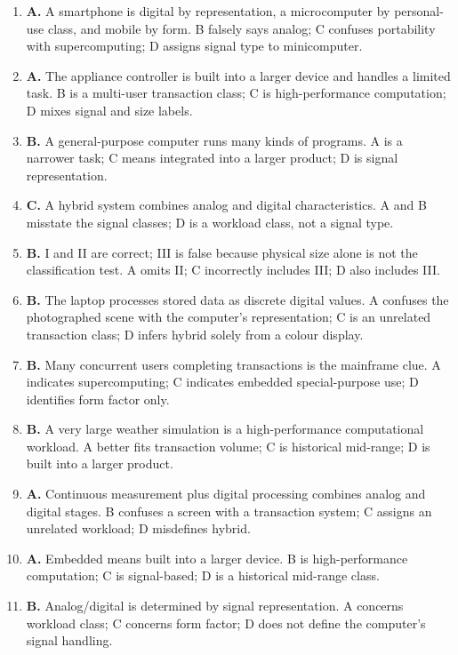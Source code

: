 \documentclass[11pt]{article}
\begin{document}
\begin{enumerate}[label=\textbf{Q\arabic*.}, leftmargin=*]
  classification axes.
\item \textbf{A.} A smartphone is digital by representation, a microcomputer
  by personal-use class, and mobile by form. B falsely says analog; C
  confuses portability with supercomputing; D assigns signal type to
  minicomputer.
\item \textbf{A.} The appliance controller is built into a larger device and
  handles a limited task. B is a multi-user transaction class; C is
  high-performance computation; D mixes signal and size labels.
\item \textbf{B.} A general-purpose computer runs many kinds of programs. A
  is a narrower task; C means integrated into a larger product; D is
  signal representation.
\item \textbf{C.} A hybrid system combines analog and digital characteristics.
  A and B misstate the signal classes; D is a workload class, not a signal
  type.
\item \textbf{B.} I and II are correct; III is false because physical size
  alone is not the classification test. A omits II; C incorrectly includes
  III; D also includes III.
\item \textbf{B.} The laptop processes stored data as discrete digital
  values. A confuses the photographed scene with the computer's
  representation; C is an unrelated transaction class; D infers hybrid
  solely from a colour display.
\item \textbf{B.} Many concurrent users completing transactions is the
  mainframe clue. A indicates supercomputing; C indicates embedded
  special-purpose use; D identifies form factor only.
\item \textbf{B.} A very large weather simulation is a high-performance
  computational workload. A better fits transaction volume; C is historical
  mid-range; D is built into a larger product.
\item \textbf{A.} Continuous measurement plus digital processing combines
  analog and digital stages. B confuses a screen with a transaction system;
  C assigns an unrelated workload; D misdefines hybrid.
\item \textbf{A.} Embedded means built into a larger device. B is
  high-performance computation; C is signal-based; D is a historical
  mid-range class.
\item \textbf{B.} Analog/digital is determined by signal representation.
  A concerns workload class; C concerns form factor; D does not define the
  computer's signal handling.


\end{enumerate}
\end{document}
